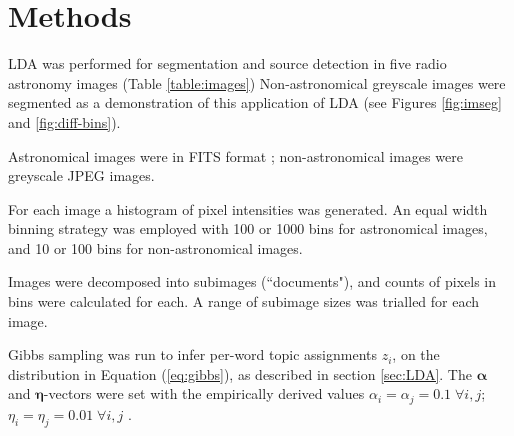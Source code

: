 \section{Methods}

LDA was performed for segmentation and source detection in five radio astronomy images (Table \ref{table:images}) Non-astronomical greyscale images were segmented as a demonstration of this application of LDA (see Figures \ref{fig:imseg} and \ref{fig:diff-bins}).

Astronomical images were in FITS format \cite{wells1981fits}; non-astronomical images were greyscale JPEG images.


For each image a histogram of pixel intensities was generated. An equal width binning strategy was employed with 100 or 1000 bins for astronomical images, and 10 or 100 bins for non-astronomical images. 

Images were decomposed into subimages (``documents"), and counts of pixels in bins were calculated for each. A range of subimage sizes was trialled for each image. 

Gibbs sampling was run to infer per-word topic assignments $z_i$, on the distribution in Equation (\ref{eq:gibbs}), as described in section \ref{sec:LDA}. The $\boldsymbol{\alpha}$ and $\boldsymbol{\eta}$-vectors were set with the empirically derived values $\alpha_i = \alpha_j = 0.1 \; \forall i,j$; $\eta_i = \eta_j = 0.01 \; \forall i,j$ \cite{steyvers2007probabilistic}.

